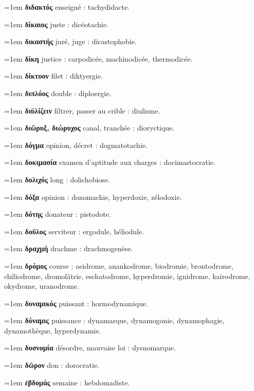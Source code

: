 \hangindent=1em \textbf{διδακτός} enseigné : tachydidacte.\par
\hangindent=1em \textbf{δίκαιος} juste : dicéotachie.\par
\hangindent=1em \textbf{δικαστής} juré, juge : dicastophobie.\par
\hangindent=1em \textbf{δίκη} justice : carpodicée, machinodicée, thermodicée.\par
\hangindent=1em \textbf{δίκτυον} filet : diktyergie.\par
\hangindent=1em \textbf{διπλόος} double : diploergie.\par
\hangindent=1em \textbf{διϋλίζειν} filtrer, passer au crible : diulisme.\par
\hangindent=1em \textbf{διῶρυξ, διώρυχος} canal, tranchée : dioryctique.\par
\hangindent=1em \textbf{δόγμα} opinion, décret : dogmatotachie.\par
\hangindent=1em \textbf{δοκιμασία} examen d'aptitude aux charges : docimastocratie.\par
\hangindent=1em \textbf{δολιχός} long : dolichobiose.\par
\hangindent=1em \textbf{δόξα} opinion : doxomachie, hyperdoxie, zélodoxie.\par
\hangindent=1em \textbf{δότης} donateur : pistodote.\par
\hangindent=1em \textbf{δοῦλος} serviteur : ergodule, héliodule.\par
\hangindent=1em \textbf{δραχμή} drachme : drachmogenèse.\par
\hangindent=1em \textbf{δρόμος} course : aeidrome, anankodrome, biodromie, brontodrome, chiliodrome, dromolâtrie, eschatodrome, hyperdromie, ignidrome, kairodrome, okydrome, uranodrome.\par
\hangindent=1em \textbf{δυναμικός} puissant : hormodynamique.\par
\hangindent=1em \textbf{δύναμις} puissance : dynamarque, dynamogonie, dynamophagie, dynamothèque, hyperdynamie.\par
\hangindent=1em \textbf{δυσνομία} désordre, mauvaise loi : dysnomarque.\par
\hangindent=1em \textbf{δῶρον} don : dorocratie.\par
\hangindent=1em \textbf{ἑβδομάς} semaine : hebdomadiste.\par
